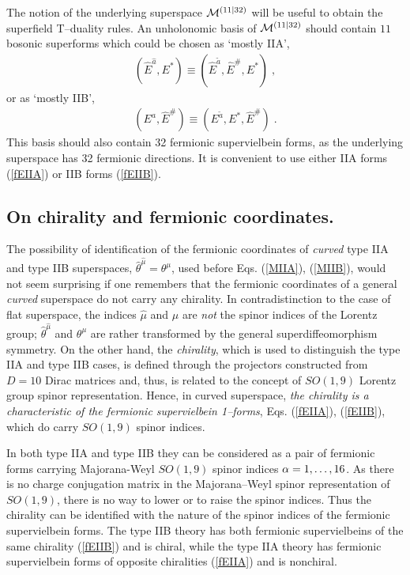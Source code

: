 \documentclass[a4paper,11pt]{article}
\begin{document}
The notion of the 
underlying superspace ${\cal M}^{(11|32)}$ will be useful to obtain 
the superfield T--duality rules. An unholonomic basis of 
${\cal M}^{(11|32)}$ should contain $11$ bosonic superforms 
which could be chosen 
as `mostly IIA', 
\begin{eqnarray}
\label{M11EbA}
(\hat{E}^{\hat{a}}, {E}^{*})\equiv  
(\hat{E}^{\tilde{a}}, \hat{E}^{\#}, E^* ) \; , 
\end{eqnarray}
or as `mostly IIB', 
\begin{eqnarray}
\label{M11EbB}
 (E^a, \hat{E}^{\#})\equiv  (E^{\tilde{a}}, E^{*}, \hat{E}^{\#} ) \; .
\end{eqnarray}
This basis should also contain 32 fermionic supervielbein forms, as the 
underlying superspace has 32 fermionic directions. 
It is convenient to use either IIA forms (\ref{fEIIA}) or IIB forms 
(\ref{fEIIB}). 





\subsection{On chirality and fermionic coordinates.}

The possibility of identification of the fermionic coordinates 
of {\sl curved} type IIA and type IIB superspaces, 
$\hat{\theta}^{{\hat{\mu}}}={\theta}^{{{\mu}}}$,  used 
before Eqs. (\ref{MIIA}), (\ref{MIIB}), would not seem surprising if 
one remembers that the fermionic coordinates of a general 
{\sl curved} superspace do not carry any chirality. 
In contradistinction to the case of flat superspace,  
the indices $\hat{{\mu}}$ and ${\mu}$   
are {\sl not} the spinor indices of the Lorentz group;  
$\hat{\theta}^{{\hat{\mu}}}$ and ${\theta}^{{{\mu}}}$ are 
rather transformed by the general superdiffeomorphism symmetry. 
On the other hand, the {\sl chirality}, which is used  to distinguish the 
type IIA and type IIB 
cases,  is defined through the projectors constructed from $D=10$ 
Dirac matrices and, thus, is related to the 
concept of $SO(1,9)$ Lorentz group spinor representation. 
Hence, in curved superspace, {\sl the chirality is a characteristic   
of the fermionic supervielbein 1--forms}, Eqs.   
(\ref{fEIIA}), (\ref{fEIIB}), which do carry $SO(1,9)$ spinor indices. 

In both type IIA and type IIB they  can be considered as 
a pair of fermionic forms carrying Majorana-Weyl $SO(1,9)$ spinor indices
${\alpha}= 1, \ldots , 16$.
As there is no charge conjugation matrix in the  Majorana--Weyl 
spinor representation of $SO(1,9)$, there is no way to lower or to raise 
the spinor indices. 
Thus the  chirality can be identified with the nature 
of the spinor indices of the fermionic supervielbein forms. 
The type IIB theory has both fermionic supervielbeins of 
the same chirality (\ref{fEIIB}) and is chiral, while 
the type IIA theory has fermionic supervielbein forms of opposite chiralities
(\ref{fEIIA}) and is nonchiral. 
\end{document}
